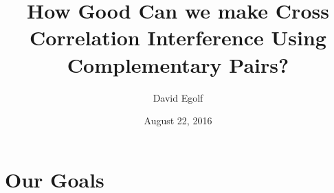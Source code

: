 \documentclass[a4paper]{article}
\title{\LARGE How Good Can we make Cross Correlation Interference Using Complementary Pairs?}
\author{David Egolf}
\date{August 22, 2016}
\begin{document}
\maketitle

\section*{Our Goals}
\end{document}
